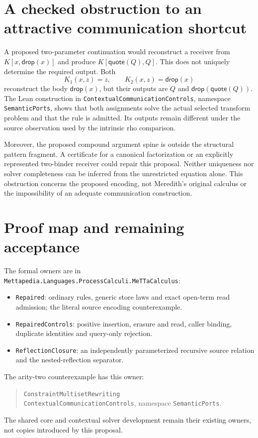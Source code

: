 \documentclass[11pt]{article}
\newcommand{\code}[1]{\texttt{\small #1}}
\begin{document}
\section{A checked obstruction to an attractive communication shortcut}

A proposed two-parameter continuation would reconstruct a receiver from
$K[x,\mathsf{drop}(x)]$ and produce $K[\mathsf{quote}(Q),Q]$.
This does not uniquely determine the required output. Both
\[
 K_1(x,z)=z,\qquad K_2(x,z)=\mathsf{drop}(x)
\]
reconstruct the body $\mathsf{drop}(x)$, but their outputs are $Q$ and
$\mathsf{drop}(\mathsf{quote}(Q))$. The Lean construction in
\code{ContextualCommunicationControls}, namespace \code{SemanticPorts}, shows
that both assignments solve the actual selected transform problem and
that the rule is admitted. Its outputs remain different under the source
observation used by the intrinsic rho comparison.

Moreover, the proposed compound argument spine is outside the structural
pattern fragment. A certificate for a canonical factorization or an
explicitly represented two-binder receiver could repair this proposal.
Neither uniqueness nor solver completeness can be inferred from the
unrestricted equation alone. This obstruction concerns the proposed
encoding, not Meredith's original calculus or the impossibility of an
adequate communication construction.

\section{Proof map and remaining acceptance}

The formal owners are in
\code{Mettapedia.Languages.ProcessCalculi.MeTTaCalculus}:
\begin{itemize}
\item \code{Repaired}: ordinary rules, generic store laws and exact
open-term read admission; the literal source encoding counterexample.
\item \code{RepairedControls}: positive insertion, erasure and read,
caller binding, duplicate identities and query-only rejection.
\item \code{ReflectionClosure}: an independently parameterized recursive
source relation and the nested-reflection separator.
\end{itemize}
The arity-two counterexample has this owner:
\begin{quote}
\code{ConstraintMultisetRewriting}\\
\code{ContextualCommunicationControls}, namespace \code{SemanticPorts}.
\end{quote}
The shared core and contextual solver development remain their existing
owners, not copies introduced by this proposal.
\end{document}
